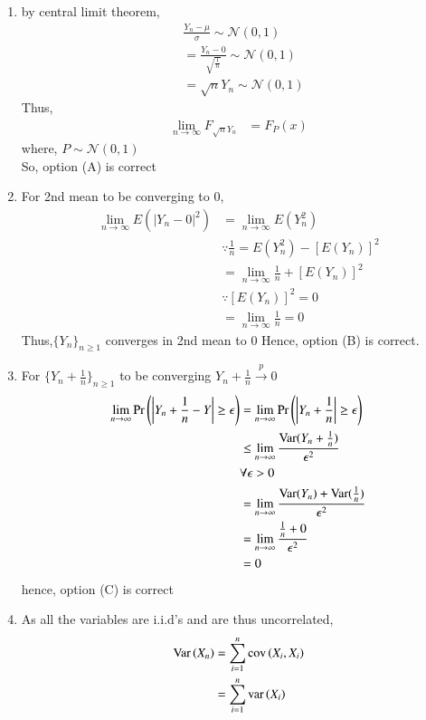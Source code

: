 \documentclass[journal,12pt,Twocolumn]{IEEEtran}
\theoremstyle{remark}
\begin{document}
\begin{enumerate}[label=(\Alph*)]
\item by central limit theorem,
\begin{align}
&\frac{Y_n-\mu}{\sigma} \sim \mathcal{N}(0,1) \\
&= \frac{Y_n-0}{\sqrt{\frac{1}{n}}} \sim \mathcal{N}(0,1) \\
&= \sqrt{n}Y_n \sim \mathcal{N}(0,1)  
\end{align}
Thus,
\begin{align}
\lim_{n \to \infty} F_{\sqrt{n}Y_n} 
&=F_P(x)
\end{align}
where, $P \sim \mathcal{N}(0,1)$ \\
So, option (A) is correct\
\item For 2nd mean to be converging to 0,
\begin{align}
\lim_{n \to \infty} E(|Y_n-0|^2)&=\lim_{n \to \infty} E(Y_n^2) \\
&\because \frac{1}{n} = E(Y_n^2) - [E(Y_n)]^2 \\
&=\lim_{n \to \infty} \frac{1}{n} + [E(Y_n)]^2 \\
&\because [E(Y_n)]^2 = 0 \\
&=\lim_{n \to \infty} \frac{1}{n} = 0 
\end{align}
Thus,$\{Y_n\}_{n \geq 1}$ converges in 2nd mean to 0
Hence, option (B) is correct.
\item For $\{Y_n+\frac{1}{n}\}_{n \geq 1}$ to be converging $Y_n +\frac{1}{n} \xrightarrow{p} 0$ \\
\begin{align}
\lim_{n \to \infty} \Pr\left(\left|Y_n +\frac{1}{n}-Y\right| \geq  \epsilon\right) 
&=\lim_{n \to \infty} \Pr\left(\left|Y_n +\frac{1}{n}\right| \geq  \epsilon\right) \\ 
&\leq \lim_{n \to \infty} \frac{\text{Var}(Y_n +\frac{1}{n})}{\epsilon^2} \\
& \forall \epsilon > 0 \\
&=\lim_{n \to \infty} \frac{\text{Var}(Y_n)+\text{Var}(\frac{1}{n})}{\epsilon^2} \\
&=\lim_{n \to \infty} \frac{\frac{1}{n}+0}{\epsilon^2} \\
&= 0
\end{align}
hence, option (C) is correct 
\item 
As all the variables are i.i.d's and are thus uncorrelated,
\begin{align}
\text{Var}\brak{X_n}&=\sum_{i=1}^{n}\text{cov}\brak{X_i, X_i} \\
&= \sum_{i=1}^{n} \text{var}\brak{X_i}\\

\end{align}
\end{enumerate}
\end{document}
